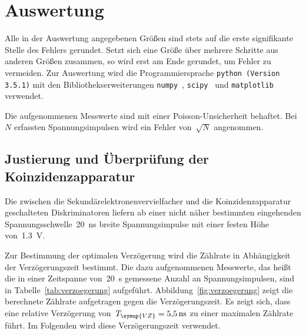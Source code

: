 \section{Auswertung}
\label{sec:auswertung}

Alle in der Auswertung angegebenen Größen sind stets auf die erste signifikante
Stelle des Fehlers gerundet. Setzt sich eine Größe über mehrere Schritte aus
anderen Größen zusammen, so wird erst am Ende gerundet, um Fehler zu vermeiden.
Zur Auswertung wird die Programmiersprache \texttt{python (Version 3.5.1)} mit
den Bibliothekserweiterungen \texttt{numpy}~\cite{numpy},
\texttt{scipy}~\cite{scipy} und \texttt{matplotlib}~\cite{matplotlib} verwendet.

Die aufgenommenen Messwerte sind mit einer Poisson-Unsicherheit behaftet.
Bei~$N$ erfassten Spannungsimpulsen wird ein Fehler von~$\sqrt{N}$ angenommen.

\subsection{Justierung und Überprüfung der Koinzidenzapparatur}

Die zwischen die Sekundärelektronenvervielfacher und die Koinzidenzapparatur
geschalteten Diskriminatoren liefern ab einer nicht näher bestimmten eingehenden
Spannungsschwelle~\SI{20}{\nano\second} breite Spannungsimpulse mit einer festen
Höhe von~\SI{1.3}{\volt}.

Zur Bestimmung der optimalen Verzögerung wird die Zählrate in Abhängigkeit der
Verzögerungszeit bestimmt. Die dazu aufgenommenen Messwerte, das heißt die in
einer Zeitspanne von~\SI{20}{\second} gemessene Anzahl an Spannungsimpulsen,
sind in Tabelle~\ref{tab:verzoegerung} aufgeführt.
Abbildung~\ref{fig:verzoegerung} zeigt die berechnete Zählrate aufgetragen gegen
die Verzögerungszeit. Es zeigt sich, dass eine relative Verzögerung
von~$T_{\symup{VZ}}=\SI{5.5}{\nano\second}$ zu einer maximalen Zählrate führt.
Im Folgenden wird diese Verzögerungszeit verwendet.

